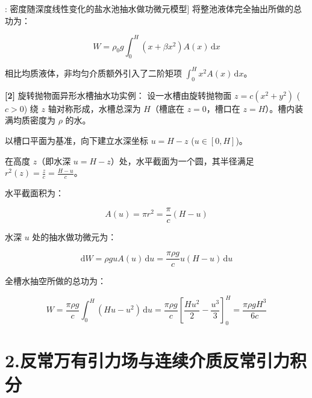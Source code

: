 \documentclass[11pt,a4paper,UTF8]{ctexart}
\begin{document}
\begin{thmbox}[模型[1]: 密度随深度线性变化的盐水池抽水做功微元模型]
将整池液体完全抽出所做的总功为：


\begin{equation*}
W = \rho_0 g \int_0^H (x + \beta x^2) A(x)\,\mathrm{d}x
\end{equation*}


相比均质液体，非均匀介质额外引入了二阶矩项 $\int_0^H x^2 A(x)\,\mathrm{d}x$。

\textbf{[2]} 旋转抛物面异形水槽抽水功实例：
设一水槽由旋转抛物面 $z = c(x^2 + y^2)$ ($c > 0$) 绕 $z$ 轴对称形成，水槽总深为 $H$（槽底在 $z = 0$，槽口在 $z = H$）。槽内装满均质密度为 $\rho$ 的水。

以槽口平面为基准，向下建立水深坐标 $u = H - z$ ($u \in [0, H]$)。

在高度 $z$（即水深 $u = H - z$）处，水平截面为一个圆，其半径满足 $r^2(z) = \frac{z}{c} = \frac{H - u}{c}$。

水平截面积为：


\begin{equation*}
A(u) = \pi r^2 = \frac{\pi}{c}(H - u)
\end{equation*}


水深 $u$ 处的抽水做功微元为：


\begin{equation*}
\mathrm{d}W = \rho g u A(u)\,\mathrm{d}u = \frac{\pi \rho g}{c} u(H - u)\,\mathrm{d}u
\end{equation*}


全槽水抽空所做的总功为：


\begin{equation*}
W = \frac{\pi \rho g}{c} \int_0^H (H u - u^2)\,\mathrm{d}u = \frac{\pi \rho g}{c} \left[\frac{H u^2}{2} - \frac{u^3}{3}\right]_0^H = \frac{\pi \rho g H^3}{6c}
\end{equation*}


\end{thmbox}

\section{2.反常万有引力场与连续介质反常引力积分}
\end{document}
